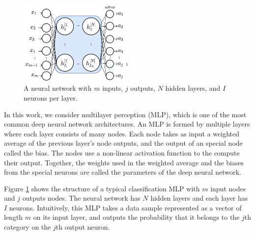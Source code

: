 \documentclass[conference]{IEEEtran}
\begin{document}
\begin{figure}[t]
\centering
\includegraphics[width=0.5\textwidth, keepaspectratio]{SimpleNN}
\caption{A neural network with $m$ inputs, $j$ outputs,  $N$  hidden layers, and $I$ neurons per layer.}
\label{fig:SimplNN}
\end{figure}
In this work, we consider multilayer perception (MLP), which is one of the most common deep neural network architectures. An
MLP is formed by multiple layers where each layer consists of many nodes. Each node takes 
as input a weighted average of the previous layer's node outputs, and the output of an special node called the bias.  
The nodes use a non-linear activation function to the compute their output. Together, the weights used in the weighted average and
the biases from the special neurons are called the parameters of the deep neural network. 




Figure \ref{fig:SimplNN} shows the structure of a typical classification MLP with $m$ input nodes and $j$ outputs nodes. The neural network
has $N$ hidden layers and each layer has $I$ neurons. Intuitively, this MLP takes a data sample represented as a vector of length
$m$ on its input layer, and outputs the probability that it belongs to the $j$th category on the $j$th output neuron.
\end{document}
